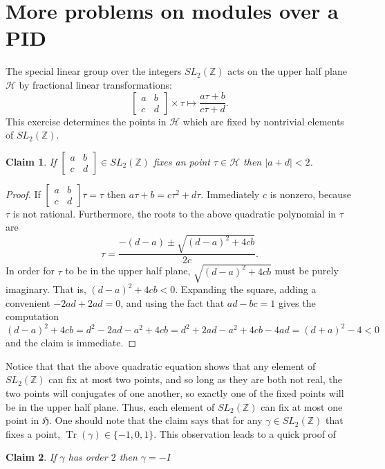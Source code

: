 \documentclass[18pt]{amsart}
\newcommand{\Z}{\mathbb{Z}}
\newcommand{\tbt}[4]{\left[ \begin{smallmatrix}
		#1 & #2 \\
		#3 & #4 
	\end{smallmatrix} \right] }
\newcommand{\Tr}{\operatorname{Tr}}
\newtheorem{claim}{Claim}
\begin{document}
\section{More problems on modules over a PID}
The special linear group over the integers  $SL_2(\Z)$ acts on the upper half plane $\mathcal{H}$ by fractional linear transformations:
	\begin{equation*}
	\tbt{a}{b}{c}{d} \times \tau \mapsto \frac{a \tau +b}{c \tau+d}.
	\end{equation*}
This exercise determines the points in $\mathcal{H}$ which are fixed by nontrivial elements of $SL_2(\Z)$. 
	\begin{claim}
		If $\tbt{a}{b}{c}{d}\in SL_2(\Z)$ fixes an point $\tau \in \mathcal{H}$ then $|a+d|<2$.
	\end{claim}
	\begin{proof}
		If $\tbt{a}{b}{c}{d} \tau =\tau$ then $a\tau +b = c\tau^2+d\tau$. Immediately $c$ is nonzero, because $\tau$ is not rational. Furthermore, the roots to the above quadratic polynomial in $\tau$ are
		\begin{equation*}
			\tau=\frac{-(d-a) \pm \sqrt{(d-a)^2 +4cb}}{2c}.
		\end{equation*}
		In order for $\tau$ to be in the upper half plane, $\sqrt{(d-a)^2 +4cb}$ must be purely imaginary. That is, $(d-a)^2 +4cb<0$. Expanding the square, adding a convenient $-2ad+2ad=0$, and using the fact that $ad-bc=1$ gives the computation
		\begin{equation*}
			(d-a)^2 +4cb=d^2-2ad-a^2+4cb=d^2+2ad-a^2+4cb-4ad=(d+a)^2-4<0
		\end{equation*}
and the claim is immediate.
	\end{proof}
Notice that that the above quadratic equation shows that any element of $SL_2(\Z)$ can fix at most two points, and so long as they are both not real, the two points will conjugates of one another, so exactly one of the fixed points will be in the upper half plane. Thus, each element of $SL_2(\Z)$ can fix at most one point in $\mathfrak{H}$. One should note that the claim says that for any $\gamma\in SL_2(\Z)$ that fixes a point, $\Tr(\gamma)\in \{-1,0,1\}$. This observation leads to a quick proof of
	\begin{claim}
		If $\gamma$ has order $2$ then $\gamma=-I$
	\end{claim}
\end{document}
